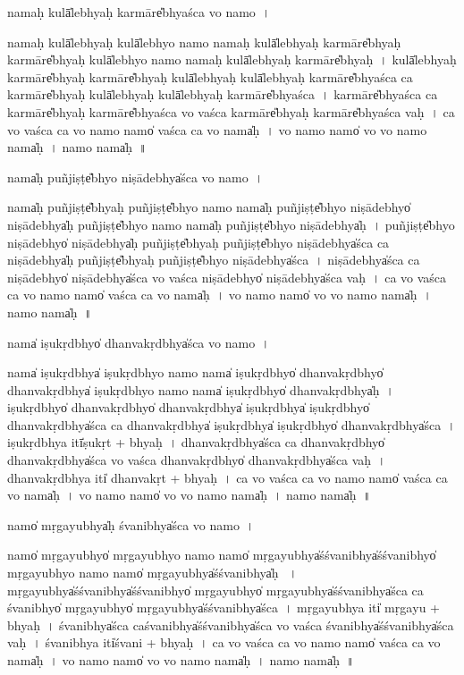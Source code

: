 \documentclass[parskip, DIV=14]{scrartcl}
\begin{document}
{nama॒ḥ kulā̍lebhyaḥ ka॒rmāre̎bhyaśca vo॒ namo॒~।

nama॒ḥ kulā̍lebhya॒ḥ kulā̍lebhyo॒ namo॒ nama॒ḥ kulā̍lebhyaḥ ka॒rmāre̎bhyaḥ ka॒rmāre̎bhya॒ḥ kulā̍lebhyo॒ namo॒ nama॒ḥ kulā̍lebhyaḥ ka॒rmāre̎bhyaḥ~।
kulā̍lebhyaḥ ka॒rmāre̎bhyaḥ ka॒rmāre̎bhya॒ḥ kulā̍lebhya॒ḥ kulā̍lebhyaḥ ka॒rmāre̎bhyaśca ca ka॒rmāre̎bhya॒ḥ kulā̍lebhya॒ḥ kulā̍lebhyaḥ ka॒rmāre̎bhyaśca~।
ka॒rmāre̎bhyaśca ca ka॒rmāre̎bhyaḥ ka॒rmāre̎bhyaśca vo vaśca ka॒rmāre̎bhyaḥ ka॒rmāre̎bhyaśca vaḥ~।
ca॒ vo॒ va॒śca॒ ca॒ vo॒ namo॒ namo̍ vaśca ca vo॒ nama̍ḥ~।
vo॒ namo॒ namo̍ vo vo॒ namo॒ nama̍ḥ~।
namo॒ nama̍ḥ~॥ 

nama̍ḥ pu॒ñjiṣṭe̎bhyo niṣā॒debhya̍śca vo॒ namo॒~।

nama̍ḥ pu॒ñjiṣṭe̎bhyaḥ pu॒ñjiṣṭe̎bhyo॒ namo॒ nama̍ḥ pu॒ñjiṣṭe̎bhyo niṣā॒debhyo̍ niṣā॒debhya̍ḥ pu॒ñjiṣṭe̎bhyo॒ namo॒ nama̍ḥ pu॒ñjiṣṭe̎bhyo niṣā॒debhya̍ḥ~।
pu॒ñjiṣṭe̎bhyo niṣā॒debhyo̍ niṣā॒debhya̍ḥ pu॒ñjiṣṭe̎bhyaḥ pu॒ñjiṣṭe̎bhyo niṣā॒debhya̍śca ca niṣā॒debhya̍ḥ pu॒ñjiṣṭe̎bhyaḥ pu॒ñjiṣṭe̎bhyo niṣā॒debhya̍śca~।
ni॒ṣā॒debhya̍śca ca niṣā॒debhyo̍ niṣā॒debhya̍śca vo vaśca niṣā॒debhyo̍ niṣā॒debhya̍śca vaḥ~।
ca॒ vo॒ va॒śca॒ ca॒ vo॒ namo॒ namo̍ vaśca ca vo॒ nama̍ḥ~।
vo॒ namo॒ namo̍ vo vo॒ namo॒ nama̍ḥ~।
namo॒ nama̍ḥ~॥  

nama̍ iṣu॒kṛdbhyo̍ dhanva॒kṛdbhya̍śca vo॒ namo॒~।

nama̍ iṣu॒kṛdbhya̍ iṣu॒kṛdbhyo॒ namo॒ nama̍ iṣu॒kṛdbhyo̍ dhanva॒kṛdbhyo̍ dhanva॒kṛdbhya̍ iṣu॒kṛdbhyo॒ namo॒ nama̍ iṣu॒kṛdbhyo̍ dhanva॒kṛdbhya̍ḥ~।  
i॒ṣu॒kṛdbhyo̍ dhanva॒kṛdbhyo̍ dhanva॒kṛdbhya̍  iṣu॒kṛdbhya̍ iṣu॒kṛdbhyo̍ dhanva॒kṛdbhya̍śca ca dhanva॒kṛdbhya̍  iṣu॒kṛdbhya̍ iṣu॒kṛdbhyo̍ dhanva॒kṛdbhya̍śca~।
i॒ṣu॒kṛdbhya॒ itī̍ṣu॒kṛt + bhya॒ḥ~।
dha॒nva॒kṛdbhya̍śca ca dhanva॒kṛdbhyo̍ dhanva॒kṛdbhya̍śca vo vaśca dhanva॒kṛdbhyo̍ dhanva॒kṛdbhya̍śca vaḥ~।
dha॒nva॒kṛdbhya॒ iti̍ dhanva॒kṛt + bhya॒ḥ~।
ca॒ vo॒ va॒śca॒ ca॒ vo॒ namo॒ namo̍ vaśca ca vo॒ nama̍ḥ~।
vo॒ namo॒ namo̍ vo vo॒ namo॒ nama̍ḥ~।
namo॒ nama̍ḥ~॥ 

namo̍ mṛga॒yubhya̍ḥ śva॒nibhya̍śca vo॒ namo॒~।

namo̍ mṛga॒yubhyo̍ mṛga॒yubhyo॒ namo॒ namo̍ mṛga॒yubhya̍śśva॒nibhya̍śśva॒nibhyo̍ mṛga॒yubhyo॒ namo॒ namo̍ mṛga॒yubhya̍śśva॒nibhya̍ḥ ~।
mṛ॒ga॒yubhya̍śśva॒nibhya̍śśva॒nibhyo̍ mṛga॒yubhyo̍ mṛga॒yubhya̍śśva॒nibhya̍śca ca śva॒nibhyo̍ mṛga॒yubhyo̍ mṛga॒yubhya̍śśva॒nibhya̍śca~।
mṛ॒ga॒yubhya॒ iti̍ mṛga॒yu + bhya॒ḥ~।
śva॒nibhya̍śca caśva॒nibhya̍śśva॒nibhya̍śca vo vaśca śva॒nibhya̍śśva॒nibhya̍śca vaḥ~।
śva॒nibhya॒ iti̍śva॒ni + bhya॒ḥ~।
ca॒ vo॒ va॒śca॒ ca॒ vo॒ namo॒ namo̍ vaśca ca vo॒ nama̍ḥ~।
vo॒ namo॒ namo̍ vo vo॒ namo॒ nama̍ḥ~।
namo॒ nama̍ḥ~॥ 

}
\end{document}
